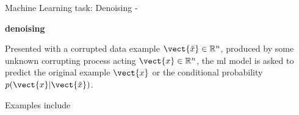 
\begin{frame}[t,allowframebreaks]{
    Machine Learning task: Denoising - }

    {\bf {}\Gls{denoising}} \\
    \vspace{0.1cm}
    \begin{itemize}
        {
            \item
            Presented with a corrupted data example 
            $\vect{\tilde{x}} \in \mathbb{R}^n$,
            produced by some unknown corrupting process acting 
            $\vect{x} \in \mathbb{R}^n$, 
            the \gls{ml} model is asked to predict
            the original example $\vect{x}$ or the
            conditional probability $p(\vect{x}|\vect{\tilde{x}})$. \\
            \vspace{0.1cm}
            \item
            Examples include \\
        }
    \end{itemize}

\end{frame}